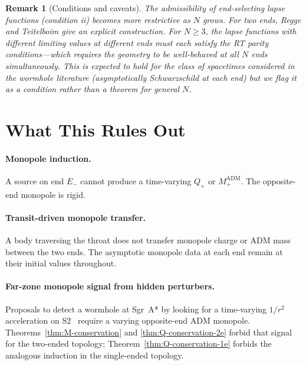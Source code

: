 \documentclass[aps,prd,onecolumn,nofootinbib,superscriptaddress]{revtex4-2}
\newtheorem{remark}{Remark}
\begin{document}
\begin{remark}[Conditions and caveats]
The admissibility of end-selecting lapse functions (condition ii) becomes more
restrictive as $N$ grows.  For two ends, Regge and Teitelboim give an explicit
construction.  For $N\ge 3$, the lapse functions with different limiting values
at different ends must each satisfy the RT parity conditions---which requires
the geometry to be well-behaved at all $N$ ends simultaneously.  This is
expected to hold for the class of spacetimes considered in the wormhole
literature (asymptotically Schwarzschild at each end) but we flag it as a
condition rather than a theorem for general $N$.
\end{remark}

\section{What This Rules Out}
\label{sec:ruled-out}

\paragraph{Monopole induction.}
A source on end $E_-$ cannot produce a time-varying $Q_+$ or $M_+^{\mathrm{ADM}}$.
The opposite-end monopole is rigid.

\paragraph{Transit-driven monopole transfer.}
A body traversing the throat does not transfer monopole charge or ADM mass
between the two ends.  The asymptotic monopole data at each end remain at their
initial values throughout.

\paragraph{Far-zone monopole signal from hidden perturbers.}
Proposals to detect a wormhole at Sgr~A* by looking for a time-varying $1/r^2$
acceleration on S2~\cite{DaiStojkovic2019Observing,SimonettiEtAl2021SensitiveSearches}
require a varying opposite-end ADM monopole.  Theorems~\ref{thm:M-conservation}
and \ref{thm:Q-conservation-2e} forbid that signal for the two-ended topology;
Theorem~\ref{thm:Q-conservation-1e} forbids the analogous induction in the
single-ended topology.
\end{document}
